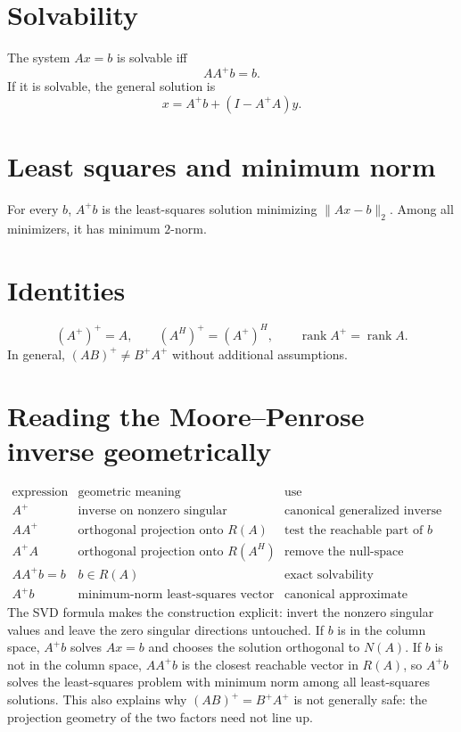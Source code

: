 \section{Solvability}
The system \(Ax=b\) is solvable iff
\[
  AA^+b=b.
\]
If it is solvable, the general solution is
\[
  x=A^+b+(I-A^+A)y.
\]

\section{Least squares and minimum norm}
For every \(b\), \(A^+b\) is the least-squares solution minimizing \(\|Ax-b\|_2\).  Among all minimizers, it has minimum \(2\)-norm.

\section{Identities}
\[
  (A^+)^+=A,\qquad (A^H)^+=(A^+)^H,\qquad \operatorname{rank}A^+=\operatorname{rank}A.
\]
In general, \((AB)^+\ne B^+A^+\) without additional assumptions.

\section{Reading the Moore--Penrose inverse geometrically}
\[
\begin{array}{c|c|c}
\text{expression} & \text{geometric meaning} & \text{use}\\
\hline
A^+ & \text{inverse on nonzero singular directions} & \text{canonical generalized inverse}\\
AA^+ & \text{orthogonal projection onto }R(A) & \text{test the reachable part of }b\\
A^+A & \text{orthogonal projection onto }R(A^H) & \text{remove the null-space ambiguity}\\
AA^+b=b & b\in R(A) & \text{exact solvability}\\
A^+b & \text{minimum-norm least-squares vector} & \text{canonical approximate solution}
\end{array}
\]
The SVD formula makes the construction explicit: invert the nonzero singular values and leave the zero singular directions untouched.  If \(b\) is in the column space, \(A^+b\) solves \(Ax=b\) and chooses the solution orthogonal to \(N(A)\).  If \(b\) is not in the column space, \(AA^+b\) is the closest reachable vector in \(R(A)\), so \(A^+b\) solves the least-squares problem with minimum norm among all least-squares solutions.  This also explains why \((AB)^+=B^+A^+\) is not generally safe: the projection geometry of the two factors need not line up.
